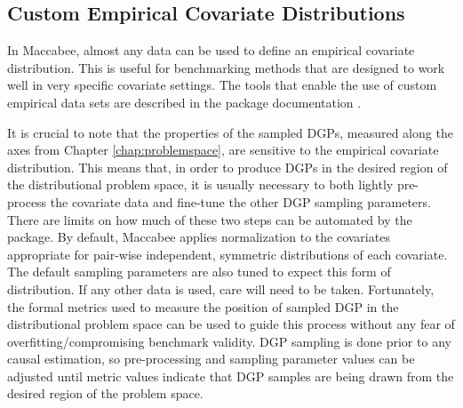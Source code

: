 \documentclass[../main.tex]{subfiles}
\begin{document}
\subsection{Custom Empirical Covariate Distributions}

 In Maccabee, almost any data can be used to define an empirical covariate distribution. This is useful for benchmarking methods that are designed to work well in very specific covariate settings. The tools that enable the use of custom empirical data sets are described in the package documentation .

 \vspace{\baselineskip}

 It is crucial to note that the properties of the sampled DGPs, measured along the axes from Chapter \ref{chap:problemspace}, are sensitive to the empirical covariate distribution. This means that, in order to produce DGPs in the desired region of the distributional problem space, it is usually necessary to both lightly pre-process the covariate data and fine-tune the other DGP sampling parameters. There are limits on how much of these two steps can be automated by the package. By default, Maccabee applies normalization to the covariates appropriate for pair-wise independent, symmetric distributions of each covariate. The default sampling parameters are also tuned to expect this form of distribution. If any other data is used, care will need to be taken. Fortunately, the formal metrics used to measure the position of sampled DGP in the distributional problem space can be used to guide this process without any fear of overfitting/compromising benchmark validity. DGP sampling is done prior to any causal estimation, so pre-processing and sampling parameter values can be adjusted until metric values indicate that DGP samples are being drawn from the desired region of the problem space.
\end{document}

